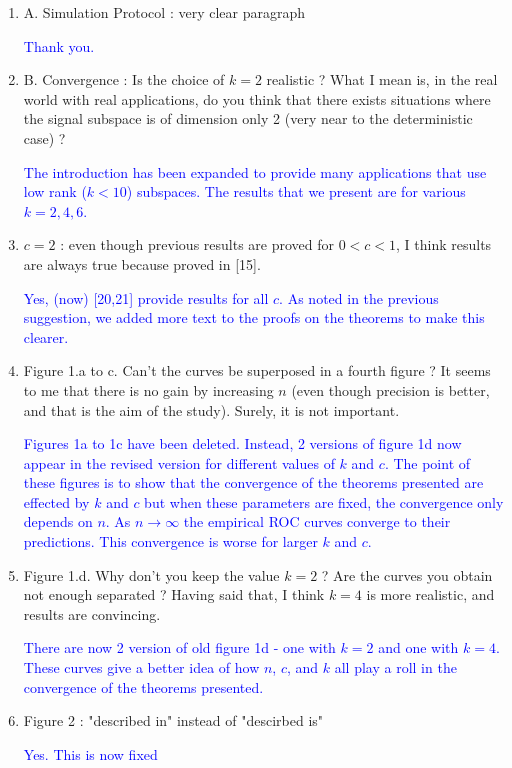 \documentclass[11pt]{article}
\begin{document}
\begin{enumerate}
\item A. Simulation Protocol : very clear paragraph

\textcolor{blue}{Thank you.}

\item B. Convergence : Is the choice of $k = 2$ realistic ? What I mean is, in the real world with real applications,
do you think that there exists situations where the signal subspace is of dimension only 2 (very near to the
deterministic case) ?

\textcolor{blue}{The introduction has been expanded to provide many applications that use low rank ($k<10$) subspaces. The results that we present are for various $k=2,4,6$.}

\item $c = 2$ : even though previous results are proved for $0 < c < 1$, I think results are always true because
proved in [15].

\textcolor{blue}{Yes, (now) [20,21] provide results for all $c$. As noted in the previous suggestion, we added more text to the proofs on the theorems to make this clearer.}

\item Figure 1.a to c. Can't the curves be superposed in a fourth figure ? It seems to me that there is no gain by
increasing $n$ (even though precision is better, and that is the aim of the study). Surely, it is not important.

\textcolor{blue}{Figures 1a to 1c have been deleted. Instead, 2 versions of figure 1d now appear in the revised version for different values of $k$ and $c$. The point of these figures is to show that the convergence of the theorems presented are effected by $k$ and $c$ but when these parameters are fixed, the convergence only depends on $n$. As $n\to\infty$ the empirical ROC curves converge to their predictions. This convergence is worse for larger $k$ and $c$.}

\item Figure 1.d. Why don't you keep the value $k = 2$ ? Are the curves you obtain not enough separated ? Having said that, I think $k = 4$ is more realistic, and results are convincing.

\textcolor{blue}{There are now 2 version of old figure 1d - one with $k=2$ and one with $k=4$. These curves give a better idea of how $n$, $c$, and $k$ all play a roll in the convergence of the theorems presented.}

\item Figure 2 : "described in" instead of "descirbed is"

\textcolor{blue}{Yes. This is now fixed}


\end{enumerate}
\end{document}
